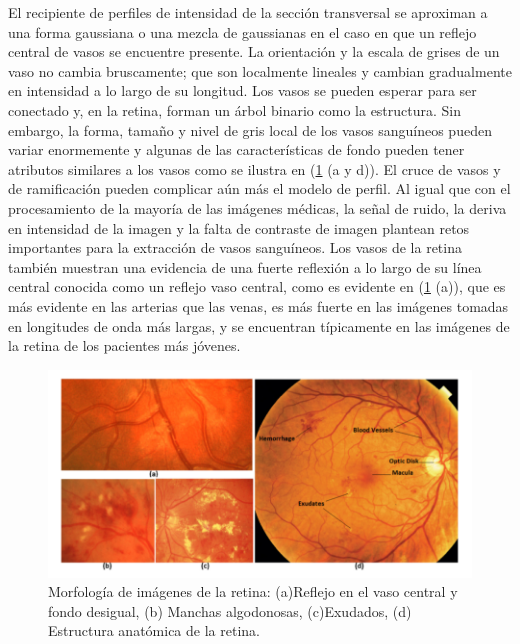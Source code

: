 El recipiente de perfiles de intensidad de la sección transversal se aproximan a una forma gaussiana o una mezcla de gaussianas en el caso en que un reflejo central de vasos se encuentre presente. La orientación y la escala de grises de un vaso no cambia bruscamente; que son localmente lineales y cambian gradualmente en intensidad a lo largo de su longitud. Los vasos se pueden esperar para ser conectado y, en la retina, forman un árbol binario como la estructura. Sin embargo, la forma, tamaño y nivel de gris local de los vasos sanguíneos pueden variar enormemente y algunas de las características de fondo pueden tener atributos similares a los vasos como se ilustra en (\ref{fig:Fondo_de_ojo} (a y d)).
El cruce de vasos y de ramificación pueden complicar aún más el modelo de perfil. Al igual que con el procesamiento de la mayoría de las imágenes médicas, la señal de ruido, la deriva en intensidad de la imagen y la falta de contraste de imagen plantean retos importantes para la extracción de vasos sanguíneos.
Los vasos de la retina también muestran una evidencia de una fuerte reflexión a lo largo de su línea central conocida como un reflejo vaso central, como es evidente en (\ref{fig:Fondo_de_ojo}  (a)), que es más evidente en las arterias que las venas, es más fuerte en las imágenes tomadas en longitudes de onda más largas, y se encuentran típicamente en las imágenes de la retina de los pacientes más jóvenes.\cite{fraz2012blood}\\


\begin{figure}[H]
	{
	\centering
	\includegraphics[width=1\textwidth]{Figures/image_ojo}
	\caption[Imagenes de Fondo de ojo]{Morfolog\'ia de im\'agenes de la retina: (a)Reflejo en el vaso central y fondo desigual, (b) Manchas algodonosas, (c)Exudados, (d) Estructura anat\'omica de la retina.}
	\label{fig:Fondo_de_ojo}
	}
\end{figure}	


